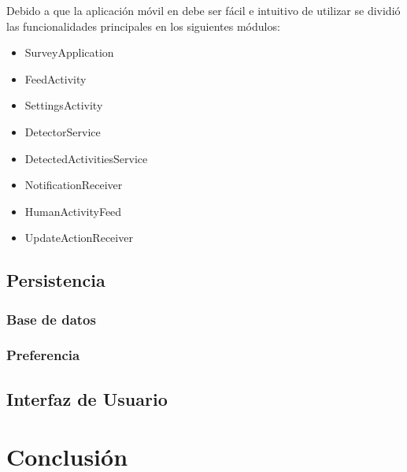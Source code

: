 Debido a que la aplicación móvil en  debe ser fácil
e intuitivo de utilizar se dividió las funcionalidades principales
en los siguientes módulos:
\begin{itemize}
\item SurveyApplication
\item FeedActivity
\item SettingsActivity
\item DetectorService
\item DetectedActivitiesService
\item NotificationReceiver
\item HumanActivityFeed
\item UpdateActionReceiver
\end{itemize}

\subsection{Persistencia}

\subsubsection{Base de datos}

\subsubsection{Preferencia}

\subsection{Interfaz de Usuario}

\section{Conclusión}

\label{sec56:conclusion}
